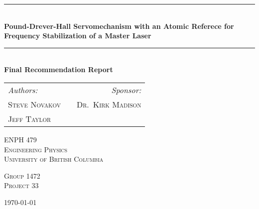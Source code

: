 \documentclass[10.5pt, a4paper, twoside]{article}
\newcommand{\HRule}{\rule{\linewidth}{0.5mm}}
\begin{document}
%
%

\begin{titlepage}
\begin{center}


\HRule \\[0.4cm]
{ \huge \bfseries Pound-Drever-Hall Servomechanism with an Atomic Referece for Frequency Stabilization of a Master Laser \\[0.4cm] }

\HRule \\[1.3cm]

{ \huge \bfseries Final Recommendation Report \\[1.3cm] }


\begin{tabularx}{\linewidth}{lXr}
  \Large \emph{Authors:} & & \Large \emph{Sponsor:} \\
  \Large \textsc{Steve Novakov} & & \Large \textsc{Dr.~Kirk Madison} \\
  \Large \textsc{Jeff Taylor}  & & \\
\end{tabularx}

\vfill

\textsc{\LARGE ENPH 479}\\[0.3cm]
\textsc{\LARGE Engineering Physics}\\[0.3cm]
\textsc{\LARGE University of British Columbia}\\[0.3cm]

\vfill

\textsc{\Large Group 1472}\\[0.3cm]
\textsc{\Large Project 33}\\[0.3cm]

\vfill

{\large \today}

\end{center}
\end{titlepage}
\newpage

\end{document}
